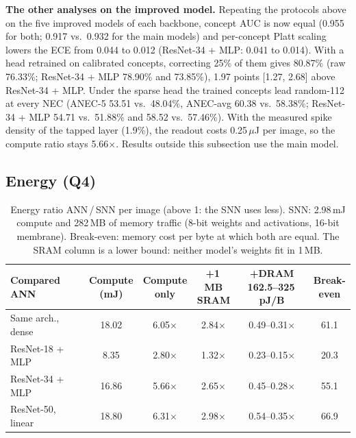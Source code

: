 \documentclass[conference]{IEEEtran}
\begin{document}
\textbf{The other analyses on the improved model.} Repeating the protocols above on the five improved models of each backbone, concept AUC is now equal (0.955 for both; 0.917 vs.\ 0.932 for the main models) and per-concept Platt scaling lowers the ECE from 0.044 to 0.012 (ResNet-34 + MLP: 0.041 to 0.014). With a head retrained on calibrated concepts, correcting 25\% of them gives 80.87\% (raw 76.33\%; ResNet-34 + MLP 78.90\% and 73.85\%), 1.97 points [1.27, 2.68] above ResNet-34 + MLP. Under the sparse head the trained concepts lead random-112 at every NEC (ANEC-5 53.51 vs.\ 48.04\%, ANEC-avg 60.38 vs.\ 58.38\%; ResNet-34 + MLP 54.71 vs.\ 51.88\% and 58.52 vs.\ 57.46\%). With the measured spike density of the tapped layer (1.9\%), the readout costs 0.25\,$\mu$J per image, so the compute ratio stays 5.66$\times$. Results outside this subsection use the main model.

\subsection{Energy (Q4)}

\begin{table}[t]
\caption{Energy ratio ANN\,/\,SNN per image (above 1: the SNN uses less). SNN: 2.98\,mJ compute and 282\,MB of memory traffic (8-bit weights and activations, 16-bit membrane). Break-even: memory cost per byte at which both are equal. The SRAM column is a lower bound: neither model's weights fit in 1\,MB.}
\label{tab:energy}
\centering
\footnotesize
\setlength{\tabcolsep}{3.2pt}
\begin{tabular}{@{}lccccc@{}}
\toprule
Compared ANN & \makecell{Compute\\(mJ)} & \makecell{Compute\\only} & \makecell{+1\,MB\\SRAM} & \makecell{+DRAM\\162.5--325\,pJ/B} & \makecell{Break-\\even} \\
\midrule
Same arch., dense & 18.02 & 6.05$\times$ & 2.84$\times$ & 0.49--0.31$\times$ & 61.1 \\
ResNet-18 + MLP & 8.35 & 2.80$\times$ & 1.32$\times$ & 0.23--0.15$\times$ & 20.3 \\
ResNet-34 + MLP & 16.86 & 5.66$\times$ & 2.65$\times$ & 0.45--0.28$\times$ & 55.1 \\
ResNet-50, linear & 18.80 & 6.31$\times$ & 2.98$\times$ & 0.54--0.35$\times$ & 66.9 \\
\bottomrule
\end{tabular}
\end{table}
\end{document}
